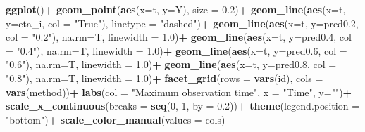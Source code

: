 \documentclass[
]{article}
\newenvironment{Shaded}{\begin{snugshade}}{\end{snugshade}}
\newcommand{\AttributeTok}[1]{\textcolor[rgb]{0.13,0.29,0.53}{#1}}
\newcommand{\DecValTok}[1]{\textcolor[rgb]{0.00,0.00,0.81}{#1}}
\newcommand{\FloatTok}[1]{\textcolor[rgb]{0.00,0.00,0.81}{#1}}
\newcommand{\FunctionTok}[1]{\textcolor[rgb]{0.13,0.29,0.53}{\textbf{#1}}}
\newcommand{\NormalTok}[1]{#1}
\newcommand{\SpecialCharTok}[1]{\textcolor[rgb]{0.81,0.36,0.00}{\textbf{#1}}}
\newcommand{\StringTok}[1]{\textcolor[rgb]{0.31,0.60,0.02}{#1}}
\begin{document}
\begin{Shaded}
\begin{Highlighting}[]
  \FunctionTok{ggplot}\NormalTok{()}\SpecialCharTok{+}
  \FunctionTok{geom\_point}\NormalTok{(}\FunctionTok{aes}\NormalTok{(}\AttributeTok{x=}\NormalTok{t, }\AttributeTok{y=}\NormalTok{Y), }\AttributeTok{size =} \FloatTok{0.2}\NormalTok{)}\SpecialCharTok{+}
  \FunctionTok{geom\_line}\NormalTok{(}\FunctionTok{aes}\NormalTok{(}\AttributeTok{x=}\NormalTok{t, }\AttributeTok{y=}\NormalTok{eta\_i, }\AttributeTok{col =} \StringTok{"True"}\NormalTok{), }\AttributeTok{linetype =} \StringTok{"dashed"}\NormalTok{)}\SpecialCharTok{+}
  \FunctionTok{geom\_line}\NormalTok{(}\FunctionTok{aes}\NormalTok{(}\AttributeTok{x=}\NormalTok{t, }\AttributeTok{y=}\NormalTok{pred0}\FloatTok{.2}\NormalTok{, }\AttributeTok{col =} \StringTok{"0.2"}\NormalTok{), }\AttributeTok{na.rm=}\NormalTok{T, }\AttributeTok{linewidth =} \FloatTok{1.0}\NormalTok{)}\SpecialCharTok{+}
  \FunctionTok{geom\_line}\NormalTok{(}\FunctionTok{aes}\NormalTok{(}\AttributeTok{x=}\NormalTok{t, }\AttributeTok{y=}\NormalTok{pred0}\FloatTok{.4}\NormalTok{, }\AttributeTok{col =} \StringTok{"0.4"}\NormalTok{), }\AttributeTok{na.rm=}\NormalTok{T, }\AttributeTok{linewidth =} \FloatTok{1.0}\NormalTok{)}\SpecialCharTok{+}
  \FunctionTok{geom\_line}\NormalTok{(}\FunctionTok{aes}\NormalTok{(}\AttributeTok{x=}\NormalTok{t, }\AttributeTok{y=}\NormalTok{pred0}\FloatTok{.6}\NormalTok{, }\AttributeTok{col =} \StringTok{"0.6"}\NormalTok{), }\AttributeTok{na.rm=}\NormalTok{T, }\AttributeTok{linewidth =} \FloatTok{1.0}\NormalTok{)}\SpecialCharTok{+}
  \FunctionTok{geom\_line}\NormalTok{(}\FunctionTok{aes}\NormalTok{(}\AttributeTok{x=}\NormalTok{t, }\AttributeTok{y=}\NormalTok{pred0}\FloatTok{.8}\NormalTok{, }\AttributeTok{col =} \StringTok{"0.8"}\NormalTok{), }\AttributeTok{na.rm=}\NormalTok{T, }\AttributeTok{linewidth =} \FloatTok{1.0}\NormalTok{)}\SpecialCharTok{+}
  \FunctionTok{facet\_grid}\NormalTok{(}\AttributeTok{rows =} \FunctionTok{vars}\NormalTok{(id), }\AttributeTok{cols =} \FunctionTok{vars}\NormalTok{(method))}\SpecialCharTok{+}
  \FunctionTok{labs}\NormalTok{(}\AttributeTok{col =} \StringTok{"Maximum observation time"}\NormalTok{, }\AttributeTok{x =} \StringTok{"Time"}\NormalTok{, }\AttributeTok{y=}\StringTok{""}\NormalTok{)}\SpecialCharTok{+}
  \FunctionTok{scale\_x\_continuous}\NormalTok{(}\AttributeTok{breaks =} \FunctionTok{seq}\NormalTok{(}\DecValTok{0}\NormalTok{, }\DecValTok{1}\NormalTok{, }\AttributeTok{by =} \FloatTok{0.2}\NormalTok{))}\SpecialCharTok{+}
  \FunctionTok{theme}\NormalTok{(}\AttributeTok{legend.position =} \StringTok{"bottom"}\NormalTok{)}\SpecialCharTok{+}
  \FunctionTok{scale\_color\_manual}\NormalTok{(}\AttributeTok{values =}\NormalTok{ cols)}
\end{Highlighting}
\end{Shaded}
\end{document}
